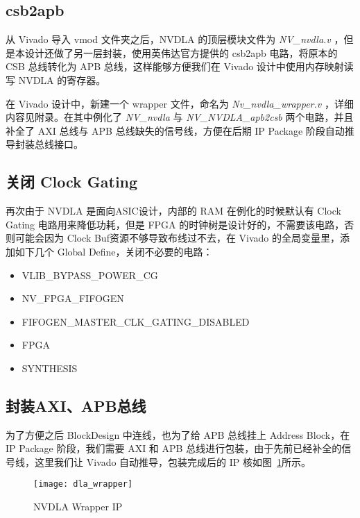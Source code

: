 \subsection{csb2apb}

从 Vivado 导入 vmod 文件夹之后，NVDLA 的顶层模块文件为 \emph{NV\_nvdla.v} ，但是本设计还做了另一层封装，使用英伟达官方提供的 csb2apb 电路，将原本的 CSB 总线转化为 APB 总线，这样能够方便我们在 Vivado 设计中使用内存映射读写 NVDLA 的寄存器。

在 Vivado 设计中，新建一个 wrapper 文件，命名为 \emph{Nv\_nvdla\_wrapper.v} ，详细内容见附录。在其中例化了 \emph{NV\_nvdla} 与 \emph{NV\_NVDLA\_apb2csb} 两个电路，并且补全了 AXI 总线与 APB 总线缺失的信号线，方便在后期 IP Package 阶段自动推导封装总线接口。

\subsection{关闭 Clock Gating}

再次由于 NVDLA 是面向ASIC设计，内部的 RAM 在例化的时候默认有 Clock Gating 电路用来降低功耗，但是 FPGA 的时钟树是设计好的，不需要该电路，否则可能会因为 Clock Buf资源不够导致布线过不去，在 Vivado 的全局变量里，添加如下几个 Global Define，关闭不必要的电路：

\begin{itemize}
    \item VLIB\_BYPASS\_POWER\_CG
    \item NV\_FPGA\_FIFOGEN
    \item FIFOGEN\_MASTER\_CLK\_GATING\_DISABLED
    \item FPGA
    \item SYNTHESIS
\end{itemize}


\subsection{封装AXI、APB总线}

为了方便之后 BlockDesign 中连线，也为了给 APB 总线挂上 Address Block，在 IP Package 阶段，我们需要 AXI 和 APB 总线进行包装，由于先前已经补全的信号线，这里我们让 Vivado 自动推导，包装完成后的 IP 核如图~\ref{fig:NVDLA Wrapper}所示。

\begin{figure}[!htbp]
    \centering
    \texttt{[image: dla\_wrapper]}
    \caption{NVDLA Wrapper IP}
    \label{fig:NVDLA Wrapper}
\end{figure}

